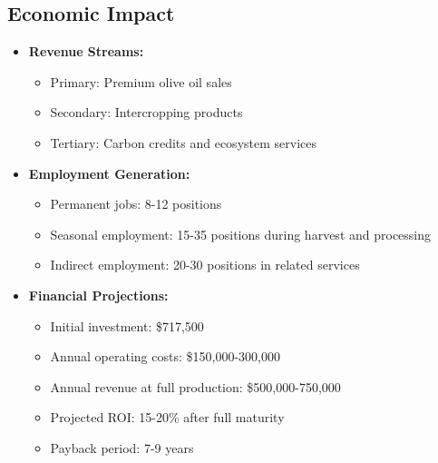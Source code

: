 \subsection{Economic Impact}
\begin{itemize}
    \item \textbf{Revenue Streams:}
    \begin{itemize}
        \item Primary: Premium olive oil sales
        \item Secondary: Intercropping products
        \item Tertiary: Carbon credits and ecosystem services
    \end{itemize}
    
    \item \textbf{Employment Generation:}
    \begin{itemize}
        \item Permanent jobs: 8-12 positions
        \item Seasonal employment: 15-35 positions during harvest and processing
        \item Indirect employment: 20-30 positions in related services
    \end{itemize}
    
    \item \textbf{Financial Projections:}
    \begin{itemize}
        \item Initial investment: \$717,500
        \item Annual operating costs: \$150,000-300,000
        \item Annual revenue at full production: \$500,000-750,000
        \item Projected ROI: 15-20\% after full maturity
        \item Payback period: 7-9 years
    \end{itemize}
\end{itemize}

